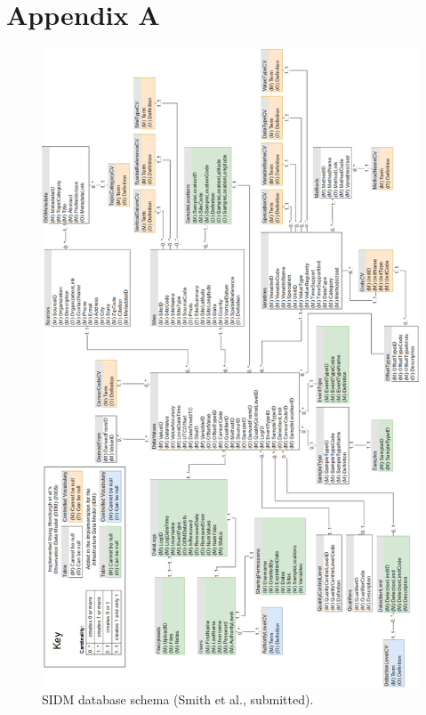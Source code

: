 %
\chapter{Appendix A}
\label{sec:appendix}
\nopagebreak
\begin{figure}[ht!]
	\centering
	\includegraphics[width=\textwidth, height=0.9\textheight, keepaspectratio]{gfx/chapter-storage/idm_schema_tall.png}
	\caption[SIDM database schema.]{SIDM database schema (Smith et al., submitted).}
\end{figure}


